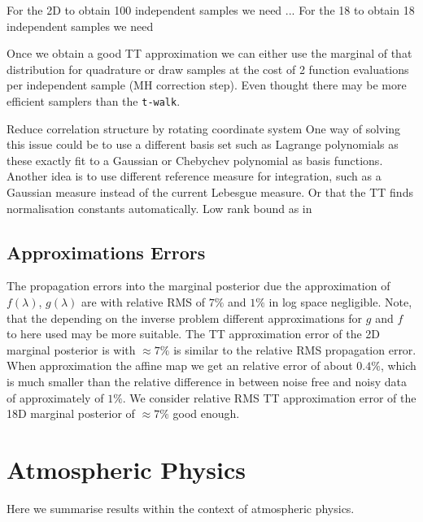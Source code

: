 For the 2D to obtain 100 independent samples we need ...
For the 18 to obtain 18 independent samples we need 

Once we obtain a good TT approximation we can either use the marginal of that distribution for quadrature or draw samples at the cost of 2 function evaluations per independent sample (MH correction step).
Even thought there may be more efficient samplers than the \texttt{t-walk}.

Reduce correlation structure by rotating coordinate system
One way of solving this issue could be to use a different basis set such as Lagrange polynomials as these exactly fit to a Gaussian or Chebychev polynomial as basis functions.
Another idea is to use different reference measure for integration, such as a Gaussian measure instead of the current Lebesgue measure.
Or that the TT finds normalisation constants automatically.
Low rank bound as in \cite{Rohrbach2022tterror}

\subsection{Approximations Errors}
The propagation errors into the marginal posterior due the approximation of $f(\lambda)$, $g(\lambda)$ are with relative RMS of $7\%$ and $1\%$ in log space negligible.
Note, that the depending on the inverse problem different approximations for $g$ and $f$ to here used may be more suitable.
The TT approximation error of the 2D marginal posterior is with $\approx 7\%$ is similar to the relative RMS propagation error.
When approximation the affine map we get an relative error of about $0.4\%$, which is much smaller than the relative difference in between noise free and noisy data of approximately of $1 \%$.
We consider relative RMS TT approximation error of the 18D marginal posterior of $\approx 7\%$ good enough.


\section{Atmospheric Physics}
Here we summarise results within the context of atmospheric physics.

